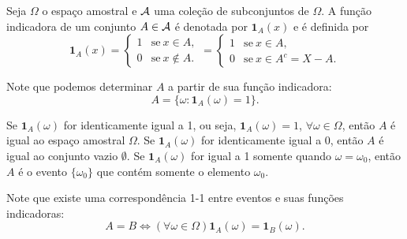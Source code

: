 \begin{frame}
\begin{defi}
	Seja $\Omega$ o espaço amostral e ${\cal A}$ uma coleção de subconjuntos de $\Omega.$ A função indicadora de um conjunto $A \in {\cal A} $ é denotada por $\mathbf{1}_A(x)$ e é definida por 
	$$
	\mathbf{1}_A(x) = 
	\begin{cases}
	1 &\text{se}\ x \in A, \\
	0 &\text{se}\ x \notin A. 
	\end{cases} = 
	\begin{cases}
	1 &\text{se}\ x \in A, \\
	0 &\text{se}\ x \in A^c = X - A. 
	\end{cases}
	$$
\end{defi}


Note que podemos determinar $A$ a partir de sua função indicadora:
$$A=\{\omega:\mathbf{1}_A(\omega)=1\}.$$
\begin{exem}
	Se $\mathbf{1}_A(\omega)$ for identicamente igual a 1, ou seja,
	$\mathbf{1}_A(\omega)=1$, $\forall\omega\in\Omega$, então $A$ é igual ao espaço
	amostral $\Omega$. Se $\mathbf{1}_A(\omega)$ for identicamente igual a 0,
	então $A$ é igual ao conjunto vazio $\emptyset$. Se $\mathbf{1}_A(\omega)$ for igual
	a 1 somente quando $\omega=\omega_0$, então $A$ é o evento
	$\{\omega_0\}$ que contém somente o elemento $\omega_0$.
\end{exem}

Note que existe uma correspondência 1-1 entre eventos e suas
funções indicadoras:
$$A=B\Leftrightarrow (\forall \omega\in\Omega)\mathbf{1}_A(\omega)=\mathbf{1}_B(\omega).$$



\end{frame}

